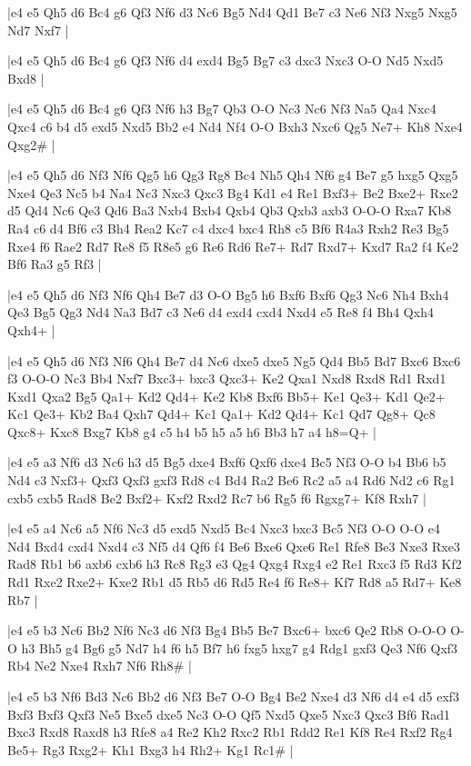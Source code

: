 \whitename{}
\blackname{}
\makegametitle
|e4 e5 Qh5 d6 Bc4 g6 Qf3 Nf6 d3 Nc6 Bg5 Nd4 Qd1 Be7 c3 Ne6 Nf3 Nxg5 Nxg5 Nd7 Nxf7  |

\whitename{}
\blackname{}
\makegametitle
|e4 e5 Qh5 d6 Bc4 g6 Qf3 Nf6 d4 exd4 Bg5 Bg7 c3 dxc3 Nxc3 O-O Nd5 Nxd5 Bxd8  |

\whitename{}
\blackname{}
\makegametitle
|e4 e5 Qh5 d6 Bc4 g6 Qf3 Nf6 h3 Bg7 Qb3 O-O Nc3 Nc6 Nf3 Na5 Qa4 Nxc4 Qxc4 c6 b4 d5 exd5 Nxd5 Bb2 e4 Nd4 Nf4 O-O Bxh3 Nxc6 Qg5 Ne7+ Kh8 Nxe4 Qxg2\#  |

\whitename{}
\blackname{}
\makegametitle
|e4 e5 Qh5 d6 Nf3 Nf6 Qg5 h6 Qg3 Rg8 Bc4 Nh5 Qh4 Nf6 g4 Be7 g5 hxg5 Qxg5 Nxe4 Qe3 Nc5 b4 Na4 Nc3 Nxc3 Qxc3 Bg4 Kd1 e4 Re1 Bxf3+ Be2 Bxe2+ Rxe2 d5 Qd4 Nc6 Qe3 Qd6 Ba3 Nxb4 Bxb4 Qxb4 Qb3 Qxb3 axb3 O-O-O Rxa7 Kb8 Ra4 c6 d4 Bf6 c3 Bh4 Rea2 Kc7 c4 dxc4 bxc4 Rh8 c5 Bf6 R4a3 Rxh2 Re3 Bg5 Rxe4 f6 Rae2 Rd7 Re8 f5 R8e5 g6 Re6 Rd6 Re7+ Rd7 Rxd7+ Kxd7 Ra2 f4 Ke2 Bf6 Ra3 g5 Rf3  |

\whitename{}
\blackname{}
\makegametitle
|e4 e5 Qh5 d6 Nf3 Nf6 Qh4 Be7 d3 O-O Bg5 h6 Bxf6 Bxf6 Qg3 Nc6 Nh4 Bxh4 Qe3 Bg5 Qg3 Nd4 Na3 Bd7 c3 Ne6 d4 exd4 cxd4 Nxd4 e5 Re8 f4 Bh4 Qxh4 Qxh4+  |

\whitename{}
\blackname{}
\makegametitle
|e4 e5 Qh5 d6 Nf3 Nf6 Qh4 Be7 d4 Nc6 dxe5 dxe5 Ng5 Qd4 Bb5 Bd7 Bxc6 Bxc6 f3 O-O-O Nc3 Bb4 Nxf7 Bxc3+ bxc3 Qxc3+ Ke2 Qxa1 Nxd8 Rxd8 Rd1 Rxd1 Kxd1 Qxa2 Bg5 Qa1+ Kd2 Qd4+ Ke2 Kb8 Bxf6 Bb5+ Ke1 Qe3+ Kd1 Qe2+ Kc1 Qe3+ Kb2 Ba4 Qxh7 Qd4+ Kc1 Qa1+ Kd2 Qd4+ Kc1 Qd7 Qg8+ Qc8 Qxc8+ Kxc8 Bxg7 Kb8 g4 c5 h4 b5 h5 a5 h6 Bb3 h7 a4 h8=Q+  |

\whitename{}
\blackname{}
\makegametitle
|e4 e5 a3 Nf6 d3 Nc6 h3 d5 Bg5 dxe4 Bxf6 Qxf6 dxe4 Bc5 Nf3 O-O b4 Bb6 b5 Nd4 c3 Nxf3+ Qxf3 Qxf3 gxf3 Rd8 c4 Bd4 Ra2 Be6 Rc2 a5 a4 Rd6 Nd2 c6 Rg1 cxb5 cxb5 Rad8 Be2 Bxf2+ Kxf2 Rxd2 Rc7 b6 Rg5 f6 Rgxg7+ Kf8 Rxh7  |

\whitename{}
\blackname{}
\makegametitle
|e4 e5 a4 Nc6 a5 Nf6 Nc3 d5 exd5 Nxd5 Bc4 Nxc3 bxc3 Bc5 Nf3 O-O O-O e4 Nd4 Bxd4 cxd4 Nxd4 c3 Nf5 d4 Qf6 f4 Be6 Bxe6 Qxe6 Re1 Rfe8 Be3 Nxe3 Rxe3 Rad8 Rb1 b6 axb6 cxb6 h3 Rc8 Rg3 e3 Qg4 Qxg4 Rxg4 e2 Re1 Rxc3 f5 Rd3 Kf2 Rd1 Rxe2 Rxe2+ Kxe2 Rb1 d5 Rb5 d6 Rd5 Re4 f6 Re8+ Kf7 Rd8 a5 Rd7+ Ke8 Rb7  |

\whitename{}
\blackname{}
\makegametitle
|e4 e5 b3 Nc6 Bb2 Nf6 Nc3 d6 Nf3 Bg4 Bb5 Be7 Bxc6+ bxc6 Qe2 Rb8 O-O-O O-O h3 Bh5 g4 Bg6 g5 Nd7 h4 f6 h5 Bf7 h6 fxg5 hxg7 g4 Rdg1 gxf3 Qe3 Nf6 Qxf3 Rb4 Ne2 Nxe4 Rxh7 Nf6 Rh8\#  |

\whitename{}
\blackname{}
\makegametitle
|e4 e5 b3 Nf6 Bd3 Nc6 Bb2 d6 Nf3 Be7 O-O Bg4 Be2 Nxe4 d3 Nf6 d4 e4 d5 exf3 Bxf3 Bxf3 Qxf3 Ne5 Bxe5 dxe5 Nc3 O-O Qf5 Nxd5 Qxe5 Nxc3 Qxc3 Bf6 Rad1 Bxc3 Rxd8 Raxd8 h3 Rfe8 a4 Re2 Kh2 Rxc2 Rb1 Rdd2 Re1 Kf8 Re4 Rxf2 Rg4 Be5+ Rg3 Rxg2+ Kh1 Bxg3 h4 Rh2+ Kg1 Rc1\#  |

